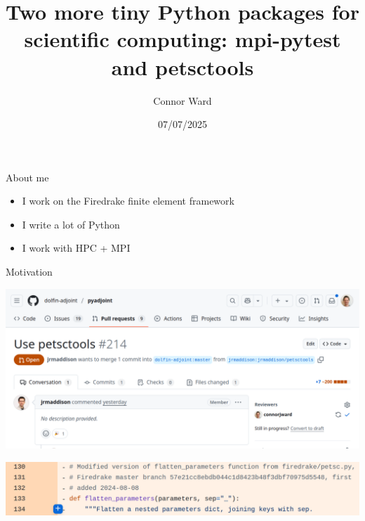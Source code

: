 \documentclass[aspectratio=169]{beamer}
\title{Two more tiny Python packages for scientific computing: mpi-pytest and petsctools}
\author{Connor Ward}
\date{07/07/2025}
\begin{document}
\frame{\titlepage}


\begin{frame}{About me}
  \begin{itemize}
    \item
      I work on the Firedrake finite element framework
    \item
      I write a lot of Python
    \item
      I work with HPC + MPI
  \end{itemize}
\end{frame}

\begin{frame}{Motivation}
  \centering

  \vspace{-2em}

  \begin{minipage}{.8\textwidth}
    \includegraphics[width=\textwidth]{figures/petsctools_pr.png}
  \end{minipage}

  \vspace{1em}

  \begin{minipage}{.8\textwidth}
    \includegraphics[width=\textwidth]{figures/dead_comment.png}
  \end{minipage}
\end{frame}
\end{document}
